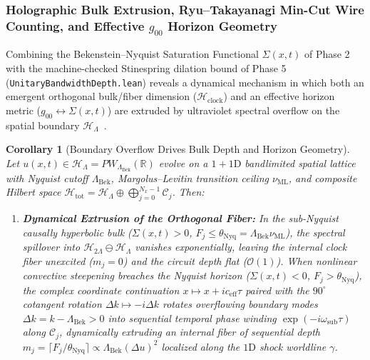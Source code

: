 \documentclass[11pt,a4paper]{article}
\newtheorem{corollary}[theorem]{Corollary}
\theoremstyle{definition}
\begin{document}
\subsubsection{Holographic Bulk Extrusion, Ryu--Takayanagi Min-Cut Wire Counting, and Effective $g_{00}$ Horizon Geometry}
\label{subsubsec:holographic-bulk-extrusion}
Combining the Bekenstein--Nyquist Saturation Functional $\Sigma(x,t)$ of Phase 2 with the machine-checked Stinespring dilation bound of Phase 5 (\texttt{Unitary\allowbreak{}Bandwidth\allowbreak{}Depth.lean}) reveals a dynamical mechanism in which both an emergent orthogonal bulk/fiber dimension ($\mathcal{H}_{\text{clock}}$) and an effective horizon metric ($g_{00} \leftrightarrow \Sigma(x,t)$) are extruded by ultraviolet spectral overflow on the spatial boundary $\mathcal{H}_{\Lambda}$~\cite{ryutakayanagi2006,swingle2012}.
\begin{corollary}[Boundary Overflow Drives Bulk Depth and Horizon Geometry]
\label{cor:rt-bulk-extrusion}
Let $u(x,t) \in \mathcal{H}_{\Lambda} = PW_{\Lambda_{\text{Bek}}}(\mathbb{R})$ evolve on a $1+1\text{D}$ bandlimited spatial lattice with Nyquist cutoff $\Lambda_{\text{Bek}}$, Margolus--Levitin transition ceiling $\nu_{\text{ML}}$, and composite Hilbert space $\mathcal{H}_{\text{tot}} = \mathcal{H}_{\Lambda} \oplus \bigoplus_{j=0}^{N_x-1} \mathcal{C}_j$. Then:
\begin{enumerate}
\item \textbf{Dynamical Extrusion of the Orthogonal Fiber:} In the sub-Nyquist causally hyperbolic bulk ($\Sigma(x,t) > 0$, $F_j \le \theta_{\text{Nyq}} = \Lambda_{\text{Bek}}\nu_{\text{ML}}$), the spectral spillover into $\mathcal{H}_{2\Lambda} \ominus \mathcal{H}_{\Lambda}$ vanishes exponentially, leaving the internal clock fiber unexcited ($m_j = 0$) and the circuit depth flat ($\mathcal{O}(1)$). When nonlinear convective steepening breaches the Nyquist horizon ($\Sigma(x,t) < 0$, $F_j > \theta_{\text{Nyq}}$), the complex coordinate continuation $x \mapsto x + i c_{\text{eff}}\tau$ paired with the $90^\circ$ cotangent rotation $\Delta k \mapsto -i\Delta k$ rotates overflowing boundary modes $\Delta k = k - \Lambda_{\text{Bek}} > 0$ into sequential temporal phase winding $\exp(-i\omega_{\text{sub}}\tau)$ along $\mathcal{C}_j$, dynamically extruding an internal fiber of sequential depth $m_j = \lceil F_j / \theta_{\text{Nyq}} \rceil \propto \Lambda_{\text{Bek}}(\Delta u)^2$ localized along the $1\text{D}$ shock worldline $\gamma$.

\end{enumerate}
\end{corollary}
\end{document}
